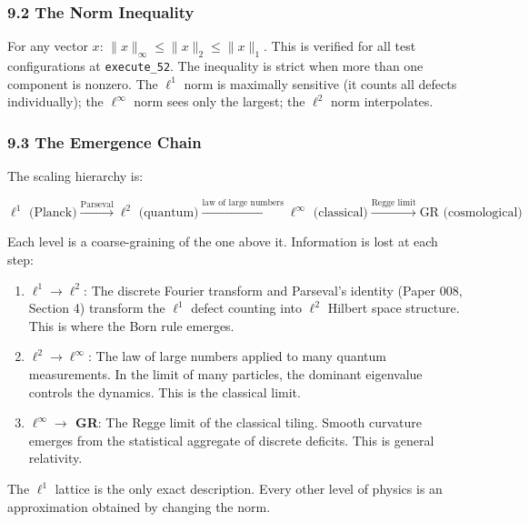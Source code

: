 \documentclass[
]{article}
\begin{document}
\hypertarget{the-norm-inequality}{%
\subsubsection{9.2 The Norm Inequality}\label{the-norm-inequality}}

For any vector \(x\): \(\|x\|_\infty \leq \|x\|_2 \leq \|x\|_1\). This
is verified for all test configurations at \texttt{execute\_52}. The
inequality is strict when more than one component is nonzero. The
\(\ell^1\) norm is maximally sensitive (it counts all defects
individually); the \(\ell^\infty\) norm sees only the largest; the
\(\ell^2\) norm interpolates.

\hypertarget{the-emergence-chain}{%
\subsubsection{9.3 The Emergence Chain}\label{the-emergence-chain}}

The scaling hierarchy is:

\[\ell^1 \text{ (Planck)} \xrightarrow{\text{Parseval}} \ell^2 \text{ (quantum)} \xrightarrow{\text{law of large numbers}} \ell^\infty \text{ (classical)} \xrightarrow{\text{Regge limit}} \text{GR (cosmological)}\]

Each level is a coarse-graining of the one above it. Information is lost
at each step:

\begin{enumerate}
\def\labelenumi{\arabic{enumi}.}
\item
  \textbf{\(\ell^1 \to \ell^2\)}: The discrete Fourier transform and
  Parseval's identity (Paper 008, Section 4) transform the \(\ell^1\)
  defect counting into \(\ell^2\) Hilbert space structure. This is where
  the Born rule emerges.
\item
  \textbf{\(\ell^2 \to \ell^\infty\)}: The law of large numbers applied
  to many quantum measurements. In the limit of many particles, the
  dominant eigenvalue controls the dynamics. This is the classical
  limit.
\item
  \textbf{\(\ell^\infty \to\) GR}: The Regge limit of the classical
  tiling. Smooth curvature emerges from the statistical aggregate of
  discrete deficits. This is general relativity.
\end{enumerate}

The \(\ell^1\) lattice is the only exact description. Every other level
of physics is an approximation obtained by changing the norm.
\end{document}
